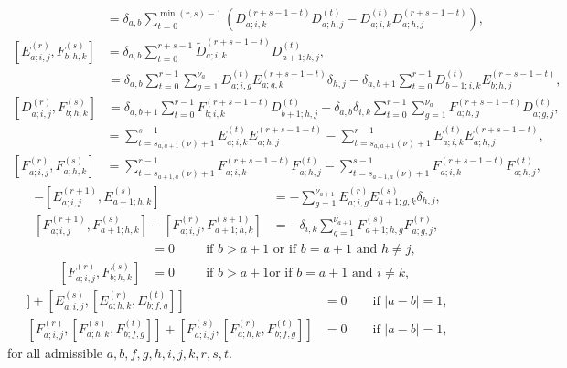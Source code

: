 \documentclass[twoside,12pt,reqno]{amsart}
\begin{document}
\begin{align}
[D_{a;i,j}^{(r)}, D_{b;h,k}^{(s)}] &=
\delta_{a,b}
\sum_{t=0}^{\min(r,s)-1}
\left(
D_{a;i,k}^{(r+s-1-t)}D_{a;h,j}^{(t)} 
-D_{a;i,k}^{(t)}D_{a;h,j}^{(r+s-1-t)} \right),\label{pr3}\\
[E_{a;i,j}^{(r)}, F_{b;h,k}^{(s)}]
&=
\delta_{a,b} \sum_{t=0}^{r+s-1}
\widetilde{D}_{a;i,k}^{(r+s-1-t)}D_{a+1;h,j}^{(t)},\label{pr6}
\end{align}\begin{align}
[D_{a;i,j}^{(r)}, E_{b;h,k}^{(s)}] &=
\delta_{a,b} 
\sum_{t=0}^{r-1} 
\sum_{g=1}^{\nu_a}D_{a;i,g}^{(t)} E_{a;g,k}^{(r+s-1-t)}\delta_{h,j}
- \delta_{a,b+1} \sum_{t=0}^{r-1}
D_{b+1;i,k}^{(t)} E_{b;h,j}^{(r+s-1-t)},\label{pr4}\\
[D_{a;i,j}^{(r)}, F_{b;h,k}^{(s)}] &=
\delta_{a,b+1} \sum_{t=0}^{r-1}
 F_{b;i,k}^{(r+s-1-t)}D_{b+1;h,j}^{(t)}-\delta_{a,b} 
\delta_{i,k}\sum_{t=0}^{r-1}\sum_{g=1}^{\nu_a} 
F_{a;h,g}^{(r+s-1-t)}D_{a;g,j}^{(t)},\label{pr5}\end{align}\begin{align}
[E_{a;i,j}^{(r)}, E_{a;h,k}^{(s)}] 
&=
\sum_{t=s_{a,a+1}(\nu)+1}^{s-1} E_{a;i,k}^{(t)} E_{a;h,j}^{(r+s-1-t)}
-\sum_{t=s_{a,a+1}(\nu)+1}^{r-1} E_{a;i,k}^{(t)} E_{a;h,j}^{(r+s-1-t)},\label{pr7}\\
[F_{a;i,j}^{(r)}, F_{a;h,k}^{(s)}] 
&=
\sum_{t=s_{a+1,a}(\nu)+1}^{r-1} F_{a;i,k}^{(r+s-1-t)}F_{a;h,j}^{(t)}-
\sum_{t=s_{a+1,a}(\nu)+1}^{s-1}
F_{a;i,k}^{(r+s-1-t)}F_{a;h,j}^{(t)},\label{pr8}\end{align}\begin{align}
[E_{a;i,j}^{(r)}, E_{a+1;h,k}^{(s+1)}]
-[E_{a;i,j}^{(r+1)}, E_{a+1;h,k}^{(s)}]
&=
-\sum_{g=1}^{\nu_{a+1}}E_{a;i,g}^{(r)} E_{a+1;g,k}^{(s)}\delta_{h,j},\label{pr9}\\
[F_{a;i,j}^{(r+1)}, F_{a+1;h,k}^{(s)}]
-[F_{a;i,j}^{(r)}, F_{a+1;h,k}^{(s+1)}]
&=
-\delta_{i,k}\sum_{g=1}^{\nu_{a+1}}F_{a+1;h,g}^{(s)}F_{a;g,j}^{(r)},\label{pr10}
\end{align}\begin{align}
[E_{a;i,j}^{(r)}, E_{b;h,k}^{(s)}] &= 0\:\:\qquad\text{if $b>a+1$ 
or if $b = a+1$ and $h \neq j$},\label{pr11}\\
[F_{a;i,j}^{(r)}, F_{b;h,k}^{(s)}] &= 0\:\:\qquad\text{if $b > a+1$
or if $b=a+1$ and $i \neq k$},\label{pr12}
\end{align}\begin{align}
[E_{a;i,j}^{(r)}, [E_{a;h,k}^{(s)}, E_{b;f,g}^{(t)}]]
+
[E_{a;i,j}^{(s)}, [E_{a;h,k}^{(r)}, E_{b;f,g}^{(t)}]] &= 0
\qquad\text{if }|a-b|=1,\label{pr13}\\
[F_{a;i,j}^{(r)}, [F_{a;h,k}^{(s)}, F_{b;f,g}^{(t)}]]
+
[F_{a;i,j}^{(s)}, [F_{a;h,k}^{(r)}, F_{b;f,g}^{(t)}]] &= 0
\qquad\text{if }|a-b|=1,\label{pr14}
\end{align}
for all admissible $a,b,f,g,h,i,j,k,r,s,t$.
\end{document}
